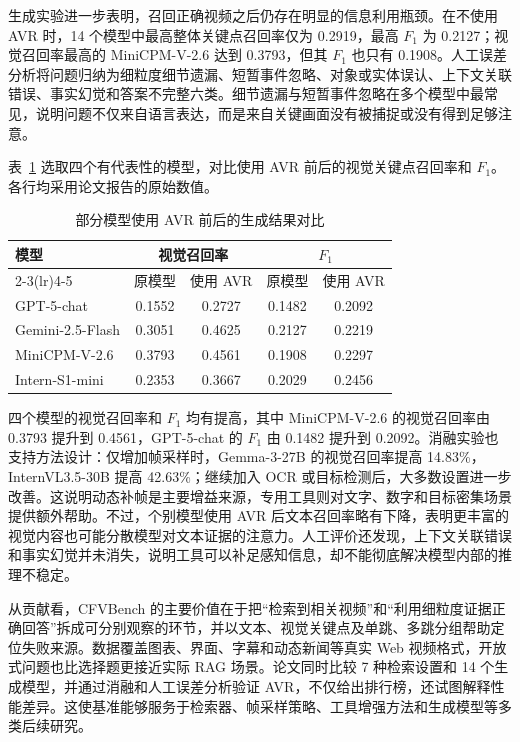 生成实验进一步表明，召回正确视频之后仍存在明显的信息利用瓶颈。在不使用 AVR 时，14 个模型中最高整体关键点召回率仅为 0.2919，最高 $F_1$ 为 0.2127；视觉召回率最高的 MiniCPM-V-2.6 达到 0.3793，但其 $F_1$ 也只有 0.1908。人工误差分析将问题归纳为细粒度细节遗漏、短暂事件忽略、对象或实体误认、上下文关联错误、事实幻觉和答案不完整六类。细节遗漏与短暂事件忽略在多个模型中最常见，说明问题不仅来自语言表达，而是来自关键画面没有被捕捉或没有得到足够注意。

表~\ref{tab:cfvbench-results} 选取四个有代表性的模型，对比使用 AVR 前后的视觉关键点召回率和 $F_1$。各行均采用论文报告的原始数值。

\begin{table}[htbp]
  \centering
  \caption{部分模型使用 AVR 前后的生成结果对比}
  \label{tab:cfvbench-results}
  \begin{tabular}{lcccc}
    \toprule
    \multirow{2}{*}{模型} & \multicolumn{2}{c}{视觉召回率} & \multicolumn{2}{c}{$F_1$} \\
    \cmidrule(lr){2-3}\cmidrule(lr){4-5}
      & 原模型 & 使用 AVR & 原模型 & 使用 AVR \\
    \midrule
    GPT-5-chat       & 0.1552 & 0.2727 & 0.1482 & 0.2092 \\
    Gemini-2.5-Flash & 0.3051 & 0.4625 & 0.2127 & 0.2219 \\
    MiniCPM-V-2.6    & 0.3793 & 0.4561 & 0.1908 & 0.2297 \\
    Intern-S1-mini   & 0.2353 & 0.3667 & 0.2029 & 0.2456 \\
    \bottomrule
  \end{tabular}
\end{table}

四个模型的视觉召回率和 $F_1$ 均有提高，其中 MiniCPM-V-2.6 的视觉召回率由 0.3793 提升到 0.4561，GPT-5-chat 的 $F_1$ 由 0.1482 提升到 0.2092。消融实验也支持方法设计：仅增加帧采样时，Gemma-3-27B 的视觉召回率提高 14.83\%，InternVL3.5-30B 提高 42.63\%；继续加入 OCR 或目标检测后，大多数设置进一步改善。这说明动态补帧是主要增益来源，专用工具则对文字、数字和目标密集场景提供额外帮助。不过，个别模型使用 AVR 后文本召回率略有下降，表明更丰富的视觉内容也可能分散模型对文本证据的注意力。人工评价还发现，上下文关联错误和事实幻觉并未消失，说明工具可以补足感知信息，却不能彻底解决模型内部的推理不稳定。

从贡献看，CFVBench 的主要价值在于把“检索到相关视频”和“利用细粒度证据正确回答”拆成可分别观察的环节，并以文本、视觉关键点及单跳、多跳分组帮助定位失败来源。数据覆盖图表、界面、字幕和动态新闻等真实 Web 视频格式，开放式问题也比选择题更接近实际 RAG 场景。论文同时比较 7 种检索设置和 14 个生成模型，并通过消融和人工误差分析验证 AVR，不仅给出排行榜，还试图解释性能差异。这使基准能够服务于检索器、帧采样策略、工具增强方法和生成模型等多类后续研究。

